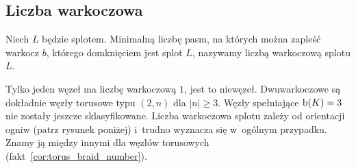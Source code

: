 
\subsection{Liczba warkoczowa}
%

\begin{definition}
\label{def:braid_number}%
    Niech $L$ będzie splotem.
    Minimalną liczbę pasm, na których można zapleść warkocz $b$, którego domknięciem jest splot $L$, nazywamy liczbą warkoczową splotu $L$.
\end{definition}

Tylko jeden węzeł ma liczbę warkoczową $1$, jest to niewęzeł.
Dwuwarkoczowe są dokładnie węzły torusowe typu $(2, n)$ dla $|n| \ge 3$.
Węzły spełniające $\operatorname{b} (K) = 3$ nie zostały jeszcze sklasyfikowane.
Liczba warkoczowa splotu zależy od orientacji ogniw (patrz rysunek poniżej) i~trudno wyznacza się w~ogólnym przypadku.
Znamy ją między innymi dla węzłów torusowych (fakt~\ref{cor:torus_braid_number}).

